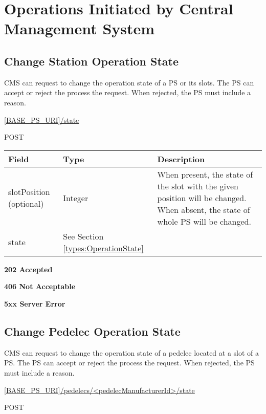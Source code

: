 \section{Operations Initiated by Central Management System}
\label{cms:main}
\subsection{Change Station Operation State}

\acs{CMS} can request to change the operation state of a \acs{PS} or its slots. The \acs{PS} can accept or reject the process the request. When rejected, the \acs{PS} must include a reason.

 \url{[BASE_PS_URI]/state}

 POST

\begin{table}[!h]
\vspace{-7mm}
\begin{tabularx}{\linewidth}{ | l | l | X | }
  \hline
  \rowcolor{table-head}
  Field & Type & Description \\
  \hline
  slotPosition (optional) & Integer 		& When present, the state of the slot with the given position will be changed. When absent, the state of whole \acs{PS} will be changed. \\
  state 					& See Section \ref{types:OperationState} \\
    \hline
\end{tabularx}
\end{table}

 \textbf{202 Accepted}

 \textbf{406 Not Acceptable}

\textbf{5xx Server Error}

\subsection{Change Pedelec Operation State}

\acs{CMS} can request to change the operation state of a pedelec located at a slot of a \acs{PS}. The \acs{PS} can accept or reject the process the request. When rejected, the \acs{PS} must include a reason.

 \url{[BASE_PS_URI]/pedelecs/<pedelecManufacturerId>/state}

 POST

